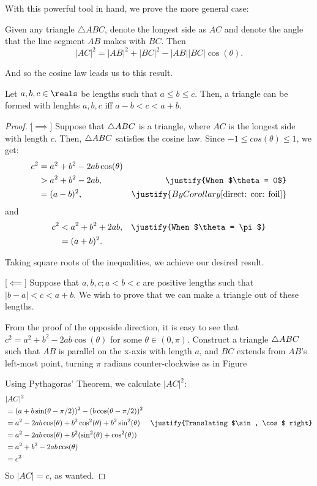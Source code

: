 With this powerful tool in hand, we prove the more general case:
\begin{theorem} 
    Given any triangle $\triangle ABC$, denote the longest side as
    $AC$ and denote the angle that the line segment $AB$ makes with $BC$. 
    Then $$|AC|^2 = |AB|^2 + |BC|^2 - |AB||BC| \cos(\theta).$$
\end{theorem}


And so the cosine law leads us to this result.
\begin{corollary}
    Let $a, b, c \in \reals$ be lengths such that $a \leq b \leq c$.
    Then, a triangle can be formed with lenghts $a, b, c$ iff $a-b < c < a+b$. 
\end{corollary}
\begin{proof} \.
    [$\implies$] Suppose that ${\triangle ABC}$ is a triangle, where $AC$ is the
    longest side with length $c$. Then, ${\triangle ABC}$ satisfies the cosine
    law. Since $-1 \leq cos(\theta) \leq 1$, we get:
    \begin{align}
        c^2 &= a^2 + b^2 - 2ab\cos(\theta) \\
            &> a^2 + b^2 - 2ab, & \justify{When $\theta = 0$} \\
            &= (a - b)^2, & \justify{By Corollary \ref{direct: cor: foil}}
    \end{align}
    and
    \begin{align}
        c^2 &< a^2 + b^2 + 2ab, & \justify{When $\theta = \pi$} \\
            &= (a + b)^2.
    \end{align}
    
    Taking square roots of the inequalities, we achieve our desired result.

    [$\impliedby$] Suppose that $a, b, c; a < b < c$ are positive
    lengths such that $|b - a| < c < a + b$.  We wish to prove
    that we can make a triangle out of these lengths.

    From the proof of the opposide direction, it is easy to see that 
    $c^2 = a^2 + b^2 - 2ab\cos(\theta)$ for some $\theta \in (0, \pi)$.
    Construct a triangle ${\triangle ABC}$ such that $AB$ is parallel on the
    x-axis with length $a$, and $BC$ extends from $AB$'s left-most point,
    turning $\pi$ radians  counter-clockwise as in Figure %

    Using Pythagoras' Theorem, we calculate $|AC|^2$:
    \begin{align}
        &|AC|^2 \\
        &= (a + b\sin(\theta - \pi/2))^2 - (b\cos(\theta - \pi/2))^2 \\
        &= a^2 - 2ab\cos(\theta) + b^2\cos^2(\theta) + b^2\sin^2(\theta)
         & \justify{Translating $\sin, \cos$ right} \\
        &= a^2 - 2ab\cos(\theta) + b^2 (\sin^2(\theta) + \cos^2(\theta)) \\
        &= a^2 + b^2 - 2ab\cos(\theta) \\
        &= c^2
    \end{align}
    So $|AC| = c$, as wanted.
\end{proof}

